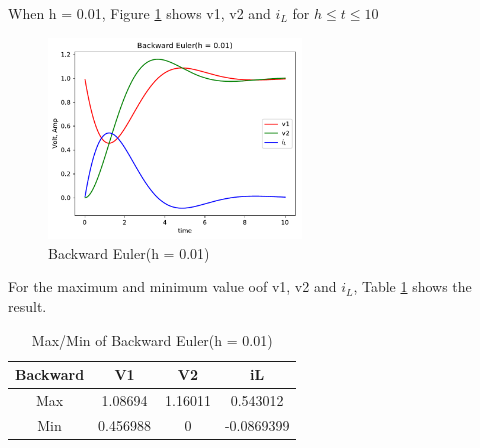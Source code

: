\documentclass{article}
\begin{document}
When h = 0.01, Figure \ref{fig:back 001} shows v1, v2 and $i_L$ for $h \leq t \leq 10$
\begin{figure}[H]
    \centering
    \includegraphics[width=0.6\textwidth]{src/back_001.pdf}
    \caption{Backward Euler(h = 0.01)}
    \label{fig:back 001}
\end{figure}
For the maximum and minimum value oof v1, v2 and $i_L$, Table \ref{tab:back 001} shows the result.
\begin{table}[htbp]
    \begin{center}
        \begin{tabular}{|c|c|c|c|}
            \hline
            Backward & V1 & V2 & iL \\ \hline
            Max & 1.08694 & 1.16011 & 0.543012 \\ \hline
            Min & 0.456988 & 0 & -0.0869399 \\ \hline
        \end{tabular}
    \end{center}
    \caption{Max/Min of Backward Euler(h = 0.01)}
    \label{tab:back 001}
\end{table}
\end{document}
